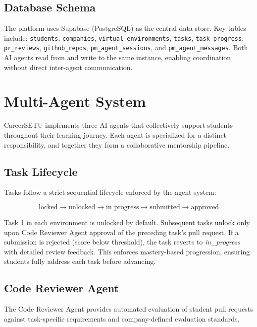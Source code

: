 \documentclass[runningheads]{llncs}
\begin{document}
\subsection{Database Schema}

The platform uses Supabase (PostgreSQL) as the central data store. Key tables include: \texttt{students}, \texttt{companies}, \texttt{virtual\_environments}, \texttt{tasks}, \texttt{task\_progress}, \texttt{pr\_reviews}, \texttt{github\_repos}, \texttt{pm\_agent\_sessions}, and \texttt{pm\_agent\_messages}. Both AI agents read from and write to the same instance, enabling coordination without direct inter-agent communication.

\section{Multi-Agent System}
\label{sec:agents}

CareerSETU implements three AI agents that collectively support students throughout their learning journey. Each agent is specialized for a distinct responsibility, and together they form a collaborative mentorship pipeline.

\subsection{Task Lifecycle}

Tasks follow a strict sequential lifecycle enforced by the agent system:

\begin{equation}
\text{locked} \rightarrow \text{unlocked} \rightarrow \text{in\_progress} \rightarrow \text{submitted} \rightarrow \text{approved}
\end{equation}

Task 1 in each environment is unlocked by default. Subsequent tasks unlock only upon Code Reviewer Agent approval of the preceding task's pull request. If a submission is rejected (score below threshold), the task reverts to \textit{in\_progress} with detailed review feedback. This enforces mastery-based progression, ensuring students fully address each task before advancing.

\subsection{Code Reviewer Agent}

The Code Reviewer Agent provides automated evaluation of student pull requests against task-specific requirements and company-defined evaluation standards.
\end{document}
